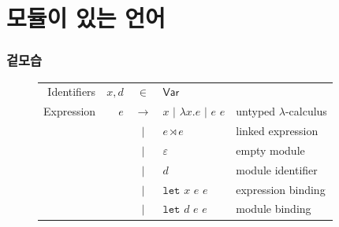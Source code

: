\documentclass{beamer}
\theoremstyle{definition}
\newcommand*{\vbar}{|}
\newcommand*{\ExprVar}{\mathsf{Var}}
\newcommand*{\modid}{d}
\newcommand*{\link}[2]{{#1}\rtimes{#2}}
\newcommand*{\Let}{\mathtt{let}}
\begin{document}
\section{모듈이 있는 언어}
\begin{frame}[c]
  \frametitle{겉모습}
  \begin{figure}[h!]
    \centering
    \begin{tabular}{rrcll}
      Identifiers & $x,\modid$ & $\in$         & $\ExprVar$                                                             \\
      Expression  & $e$        & $\rightarrow$ & $x$ $\vbar$ $\lambda x.e$ $\vbar$ $e$ $e$ & untyped $\lambda$-calculus \\
                  &            & $\vbar$       & $\link{e}{e}$                             & linked expression          \\
                  &            & $\vbar$       & $\varepsilon$                             & empty module               \\
                  &            & $\vbar$       & $\modid$                                  & module identifier          \\
                  &            & $\vbar$       & $\Let$ $x$ $e$ $e$                        & expression binding         \\
                  &            & $\vbar$       & $\Let$ $\modid$ $e$ $e$                   & module binding             \\
    \end{tabular}
  \end{figure}
\end{frame}
\end{document}
